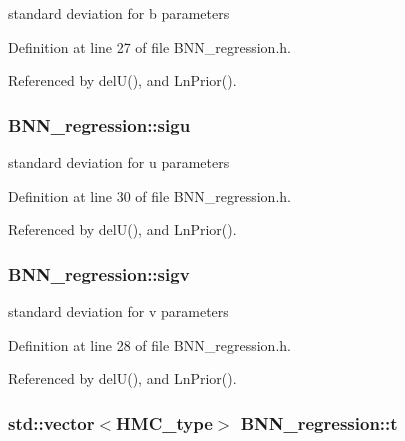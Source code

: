 standard deviation for b parameters 



Definition at line 27 of file B\-N\-N\-\_\-regression.\-h.



Referenced by del\-U(), and Ln\-Prior().

\hypertarget{class_b_n_n__regression_ac7097e88870f47f312e8de1c6f81c04b}{
\subsubsection[{sigu}]{ B\-N\-N\-\_\-regression\-::sigu\hspace{0.3cm}{\ttfamily [private]}}}\label{class_b_n_n__regression_ac7097e88870f47f312e8de1c6f81c04b}


standard deviation for u parameters 



Definition at line 30 of file B\-N\-N\-\_\-regression.\-h.



Referenced by del\-U(), and Ln\-Prior().

\hypertarget{class_b_n_n__regression_af06eef668a70e92a122b185c55003b66}{
\subsubsection[{sigv}]{ B\-N\-N\-\_\-regression\-::sigv\hspace{0.3cm}{\ttfamily [private]}}}\label{class_b_n_n__regression_af06eef668a70e92a122b185c55003b66}


standard deviation for v parameters 



Definition at line 28 of file B\-N\-N\-\_\-regression.\-h.



Referenced by del\-U(), and Ln\-Prior().

\hypertarget{class_b_n_n__regression_aa99d3e95fd4751552cbafec043b4b27d}{
\subsubsection[{t}]{\setlength{\rightskip}{0pt plus 5cm}std\-::vector$<${\bf H\-M\-C\-\_\-type}$>$ B\-N\-N\-\_\-regression\-::t\hspace{0.3cm}{\ttfamily [private]}}}\label{class_b_n_n__regression_aa99d3e95fd4751552cbafec043b4b27d}


